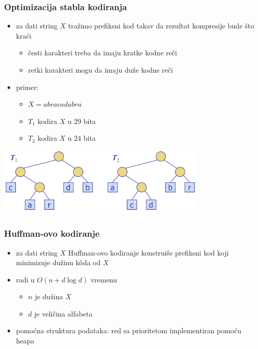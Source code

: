 \documentclass[compress]{beamer}
\begin{document}
\begin{frame}[fragile]
  \frametitle{Optimizacija stabla kodiranja}
  \begin{itemize}
    \item za dati string $X$ tražimo prefiksni kod takav da rezultat 
    kompresije bude što kraći
    \begin{itemize}
      \item česti karakteri treba da imaju kratke kodne reči
      \item retki karakteri mogu da imaju duže kodne reči
    \end{itemize}
    \item primer:
    \begin{itemize}
      \item $X = abracadabra$
      \item $T_{1}$ kodira $X$ u 29 bita
      \item $T_{2}$ kodira $X$ u 24 bita
    \end{itemize}
  \end{itemize}
  \begin{center}
    \includegraphics[width=10cm]{asp-13-pic13.png}
  \end{center}
\end{frame}

\begin{frame}[fragile]
  \frametitle{Huffman-ovo kodiranje}
  \begin{itemize}
    \item za dati string $X$ Huffman-ovo kodiranje konstruiše prefiksni 
    kod koji minimizuje dužinu kôda od $X$
    \item radi u $O(n + d\log d)$ vremenu
    \begin{itemize}
      \item $n$ je dužina $X$ 
      \item $d$ je veličina alfabeta
    \end{itemize}
    \item pomoćna struktura podataka: red sa prioritetom implementiran pomoću heapa
  \end{itemize}
\end{frame}
\end{document}
